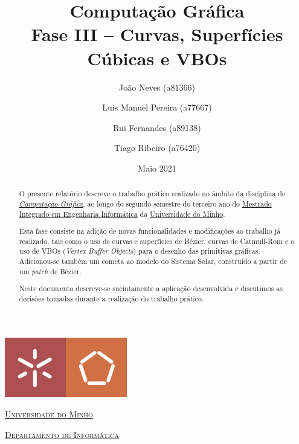 \documentclass[a4paper, 11pt]{article}
\title{Computação Gráfica \\ [0.8em] \smaller{}Fase III -- Curvas, Superfícies Cúbicas e VBOs}
\author{João Neves (a81366) \and Luís Manuel Pereira (a77667) \and Rui Fernandes (a89138)
\and Tiago Ribeiro (a76420)}
\date{Maio 2021}
\begin{document}
\nocite{*}

\begin{titlepage}
    \begin{center}
        \begin{minipage}{.75\linewidth}
            \centering
            \includegraphics[width=0.4\textwidth]{img/EEUM.png}\par\vspace{1cm}
            \vspace{1.5cm}
            \href{https://www.uminho.pt/PT}{\scshape\LARGE Universidade do Minho} \par
            \vspace{1cm}
            \href{https://www.di.uminho.pt/}{\scshape\Large Departamento de Informática} \par
            \vspace{1.5cm}
            \maketitle
        \end{minipage}
    \end{center}
    \vspace{2cm}
    \thispagestyle{empty}
    \clearpage
\end{titlepage}


\begin{abstract}
O presente relatório descreve o trabalho prático realizado no âmbito da disciplina de 
\href{https://miei.di.uminho.pt/plano_estudos.html#computa_o_gr_fica}{\emph{Computação 
Gráfica}}, ao longo do segundo semestre do terceiro ano do 
\href{http://miei.di.uminho.pt}{Mestrado Integrado em Engenharia Informática} da 
\href{https://www.uminho.pt}{Universidade do Minho}.

Esta fase consiste na adição de novas funcionalidades e modificações ao trabalho já realizado, 
tais como o uso de curvas e superfícies de Bézier, curvas de Catmull-Rom e o uso de VBOs 
(\textit{Vertex Buffer Objects}) para o desenho das primitivas gráficas. Adicionou-se também um 
cometa ao modelo do Sistema Solar, construído a partir de um \textit{patch} de Bézier.

Neste documento descreve-se sucintamente a aplicação desenvolvida e discutimos as decisões 
tomadas durante a realização do trabalho prático.
\end{abstract}
\end{document}
